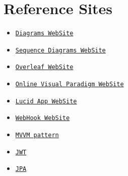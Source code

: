 \section{Reference Sites}
\begin{itemize}
    \item \href{https://diagrams.net/}{\texttt{Diagrams WebSite}}
    \item \href{https://sequencediagram.org/}{\texttt{Sequence Diagrams WebSite}}
    \item \href{https://overleaf.com/}{\texttt{Overleaf WebSite}}
    \item \href{https://online.visual-paradigm.com/}{\texttt{Online Visual Paradigm WebSite}}
    \item \href{https://lucid.app/}{\texttt{Lucid App WebSite}}
    \item \href{https://programmableweb.com/news/what-are-webhooks-and-how-do-they-enable-real-time-web/2012/01/30}{\texttt{WebHook WebSite}}\label{webhook}
    \item \href{https://learn.microsoft.com/en-us/archive/msdn-magazine/2013/november/mvvm-writing-a-testable-presentation-layer-with-mvvm}{\texttt{MVVM pattern}}
    \item \href{https://jwt.io/}{\texttt{JWT}} \label{jwt}
    \item \href{https://www.ibm.com/docs/it/was-liberty/base?topic=overview-java-persistence-api-jpa}{\texttt{JPA}} \label{jpa}
\end{itemize}